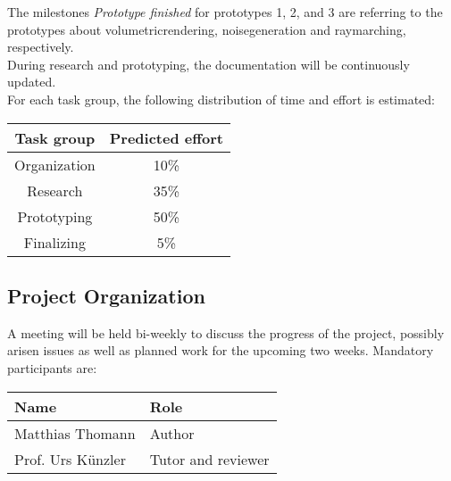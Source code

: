 \vspace{\baselineskip}
\begin{flushleft}
The milestones \emph{Prototype finished} for prototypes 1, 2, and 3 are referring to the prototypes about \gls{volumetricrendering}, \gls{noisegeneration} and \gls{raymarching}, respectively.
\\
\vspace{\baselineskip}
During research and prototyping, the documentation will be continuously updated.
\\
For each task group, the following distribution of time and effort is estimated:
\newline
\newline
\begin{tabular}{|c|c|}
    \hline
    \textbf{Task group}  & \textbf{Predicted effort}\\ \hline
    Organization        & 10\%                      \\ \hline
    Research            & 35\%                      \\ \hline
    Prototyping         & 50\%                      \\ \hline
    Finalizing          & 5\%                       \\ \hline
\end{tabular}
\end{flushleft} 


\clearpage
\subsection{Project Organization}
A meeting will be held bi-weekly to discuss the progress of the project, possibly arisen issues as well as planned work for the upcoming two weeks.
\vspace{\baselineskip}
\newline
\noindent Mandatory participants are:
\vspace{\baselineskip}
\newline
\noindent\begin{tabular}{|l|l|}
    \hline
    \textbf{Name}       & \textbf{Role}         \\ \hline
    Matthias Thomann    & Author                \\ \hline
    Prof. Urs Künzler   & Tutor and reviewer    \\ \hline
\end{tabular}

